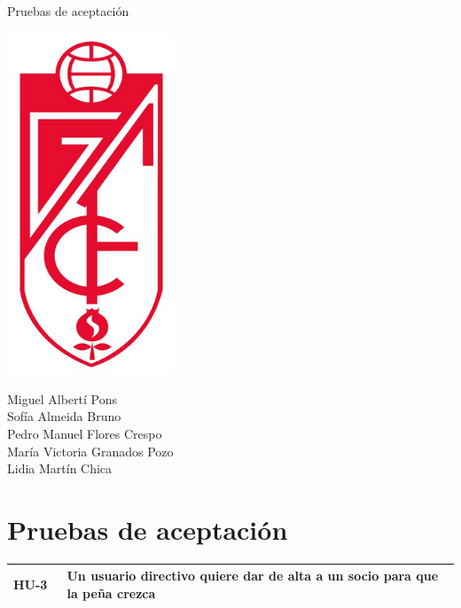 \documentclass[11pt]{article}
\begin{document}
\begin{titlepage}
\centering
\vspace{4.5cm}
\scshape\LARGE{Pruebas de aceptación\par}
\vspace{1.5cm}

\includegraphics[width=5cm]{escudoGR}

\vspace{1.5cm}
{\scshape\large \par}
\vspace{1cm}

{Miguel Albertí Pons\\
Sofía Almeida Bruno\\
Pedro Manuel Flores Crespo\\
María Victoria Granados Pozo\\
Lidia Martín Chica
\par}



\end{titlepage}
\newpage

\section{Pruebas de aceptación}
  \begin{longtable}{p{0.12\linewidth}p{0.88\linewidth}}
    \toprule
    \textbf{HU-3} & Un usuario directivo quiere dar de alta a un socio para que la peña crezca\\
    \bottomrule
  \end{longtable}
\end{document}

